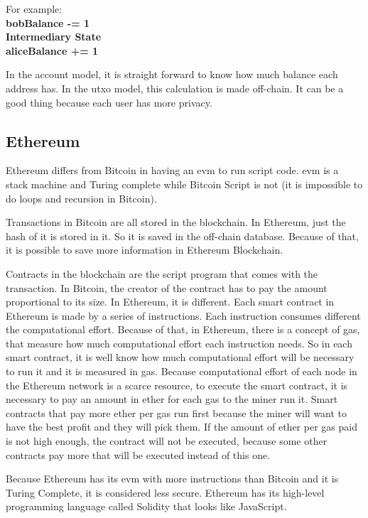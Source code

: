 For example: \\
\textbf{
bobBalance -= 1 \\
Intermediary State \\
aliceBalance += 1
}

In the account model, it is straight forward to know how much balance each address has.
In the \gls{utxo} model, this calculation is made off-chain. It can be a good thing
because each user has more privacy.

\subsection{Ethereum}

Ethereum differs from Bitcoin in having an \gls{evm} to run script code.
\gls{evm} is a stack machine and Turing complete \cite{turing1936computable} while Bitcoin Script is not
(it is impossible to do loops and recursion in Bitcoin).

Transactions in Bitcoin are all stored in the blockchain.
In Ethereum, just the hash of it is stored in it.
So it is saved in the off-chain database.
Because of that, it is possible to save more information in Ethereum Blockchain.

Contracts in the blockchain are the script program that comes with the transaction.
In Bitcoin, the creator of the contract has to pay the amount proportional to its size.
In Ethereum, it is different.
Each smart contract in Ethereum is made by a series of instructions.
Each instruction consumes different the computational effort.
Because of that, in Ethereum, there is a concept of gas, that measure how much computational effort
each instruction needs.
So in each smart contract, it is well know how much computational effort will be necessary to run it
and it is measured in gas.
Because computational effort of each node in the Ethereum network is a scarce resource,
to execute the smart contract, it is necessary to
pay an amount in ether for each gas to the miner run it.
Smart contracts that pay more ether per gas run first because the miner will want to have the best
profit and they will pick them.
If the amount of ether per gas paid is not high enough, the contract will not be executed,
because some other contracts pay more that will be executed instead of this one.

Because Ethereum has its \gls{evm} with more instructions than Bitcoin and it is Turing Complete,
it is considered less secure.
Ethereum has its high-level programming language called Solidity that looks like JavaScript.
